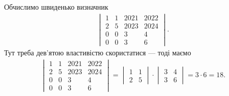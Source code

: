 \documentclass{math_library}
\begin{document}
\begin{example}
Обчислимо швиденько визначник
\begin{align*}
\begin{vmatrix}
1 & 1 & 2021 & 2022 \\
2 & 5 & 2023 & 2024 \\
0 & 0 & 3 & 4 \\
0 & 0 & 3 & 6
\end{vmatrix}.
\end{align*}
Тут треба дев'ятою властивістю скористатися --- тоді маємо
\begin{align*}
\begin{vmatrix}
1 & 1 & 2021 & 2022 \\
2 & 5 & 2023 & 2024 \\
0 & 0 & 3 & 4 \\
0 & 0 & 3 & 6
\end{vmatrix} = \begin{vmatrix}
1 & 1 \\
2 & 5
\end{vmatrix} \cdot \begin{vmatrix}
3 & 4 \\
3 & 6
\end{vmatrix} = 3 \cdot 6 = 18.
\end{align*}
\end{example}
\end{document}
